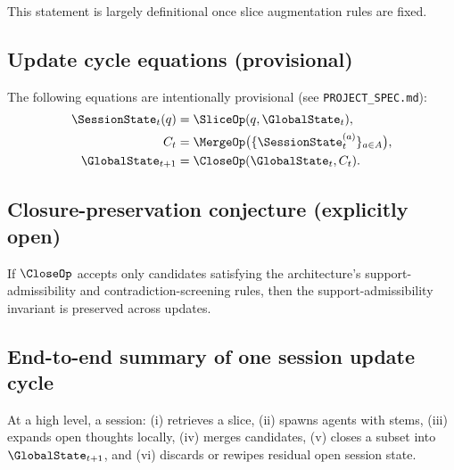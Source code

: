 This statement is largely definitional once slice augmentation rules are fixed.

\subsection{Update cycle equations (provisional)}
The following equations are intentionally provisional (see \texttt{PROJECT\_SPEC.md}):
\begin{align}
  \SessionState_t(q) &= \SliceOp(q, \GlobalState_t), \\
  C_t &= \MergeOp\big(\{\SessionState_t^{(a)}\}_{a\in A}\big), \\
  \GlobalState_{t+1} &= \CloseOp(\GlobalState_t, C_t).
\end{align}

\subsection{Closure-preservation conjecture (explicitly open)}
\begin{conjecture}
\label{conj:close-preserve}
If $\CloseOp$ accepts only candidates satisfying the architecture's support-admissibility and contradiction-screening rules, then the support-admissibility invariant is preserved across updates.
\end{conjecture}

\subsection{End-to-end summary of one session update cycle}
At a high level, a session: (i) retrieves a slice, (ii) spawns agents with stems, (iii) expands open thoughts locally, (iv) merges candidates, (v) closes a subset into $\GlobalState_{t+1}$, and (vi) discards or rewipes residual open session state.
\fi
